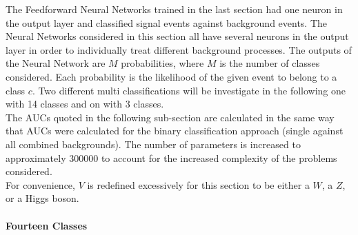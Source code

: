 The Feedforward Neural Networks trained in the last section had one neuron in the output layer and classified signal events against background events. The Neural Networks considered in this section all have several neurons in the output layer in order to individually treat different background processes. The outputs of the Neural Network are $M$ probabilities, where $M$ is the number of classes considered. Each probability is the likelihood of the given event to belong to a class $c$. Two different multi classifications will be investigate in the following one with 14 classes and on with 3 classes. \\
The AUCs quoted in the following sub-section are calculated in the same way that AUCs were calculated for the binary classification approach (single against all combined backgrounds). The number of parameters is increased to approximately 300000 to account for the increased complexity of the problems considered.\\
For convenience, $V$ is redefined excessively for this section to be either a $W$, a $Z$, or a Higgs boson.

\paragraph{Fourteen Classes} \mbox{} \\

